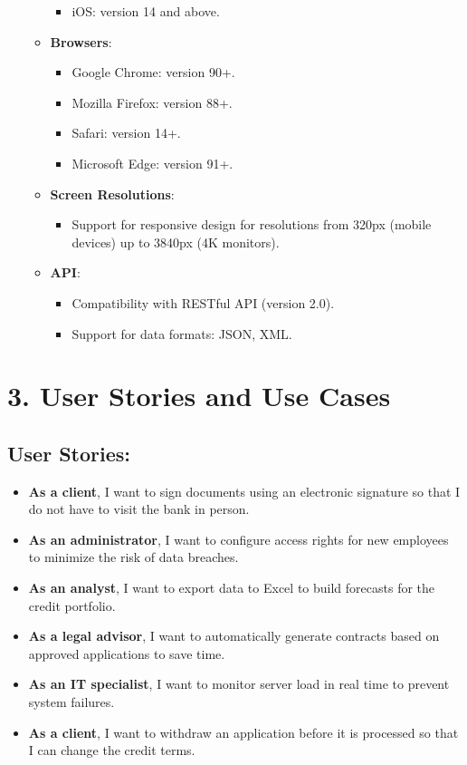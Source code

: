 \documentclass[a4paper,12pt]{article}
\begin{document}
\begin{itemize}
\begin{itemize}
\begin{itemize}
                \item iOS: version 14 and above.
            \end{itemize}
        \item \textbf{Browsers}:
            \begin{itemize}
                \item Google Chrome: version 90+.
                \item Mozilla Firefox: version 88+.
                \item Safari: version 14+.
                \item Microsoft Edge: version 91+.
            \end{itemize}
        \item \textbf{Screen Resolutions}:
            \begin{itemize}
                \item Support for responsive design for resolutions from 320px (mobile devices) up to 3840px (4K monitors).
            \end{itemize}
        \item \textbf{API}:
            \begin{itemize}
                \item Compatibility with RESTful API (version 2.0).
                \item Support for data formats: JSON, XML.
            \end{itemize}
    \end{itemize}
\end{itemize}

\section*{3. User Stories and Use Cases}

\subsection*{User Stories:}
\begin{itemize}
    \item \textbf{As a client}, I want to sign documents using an electronic signature so that I do not have to visit the bank in person.
    \item \textbf{As an administrator}, I want to configure access rights for new employees to minimize the risk of data breaches.
    \item \textbf{As an analyst}, I want to export data to Excel to build forecasts for the credit portfolio.
    \item \textbf{As a legal advisor}, I want to automatically generate contracts based on approved applications to save time.
    \item \textbf{As an IT specialist}, I want to monitor server load in real time to prevent system failures.
    \item \textbf{As a client}, I want to withdraw an application before it is processed so that I can change the credit terms.
\end{itemize}
\end{document}
